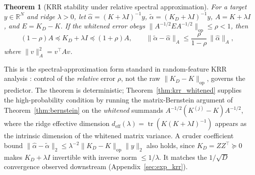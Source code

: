 \documentclass{article}
\newtheorem{theorem}{Theorem}[section]
\begin{document}
\begin{theorem}[KRR stability under relative spectral approximation]\label{thm:krr_spectral}
For a target $y\in\mathbb{R}^N$ and ridge $\lambda>0$, let $\hat\alpha=(K+\lambda I)^{-1}y$, $\tilde\alpha=(K_D+\lambda I)^{-1}y$, $A=K+\lambda I$, and $E=K_D-K$. If the whitened error obeys $\|A^{-1/2}EA^{-1/2}\|_{\mathrm{op}}\le\rho<1$, then
\[
(1-\rho)A\preceq K_D+\lambda I\preceq(1+\rho)A,\qquad \|\tilde\alpha-\hat\alpha\|_A\le\frac{\rho}{1-\rho}\,\|\hat\alpha\|_A,
\]
where $\|v\|_A^2=v^\top A v$.
\end{theorem}
\noindent This is the spectral-approximation form standard in random-feature KRR analysis \citep{avron2017random}: control of the \emph{relative} error $\rho$, not the raw $\|K_D-K\|_{\mathrm{op}}$, governs the predictor. The theorem is deterministic; Theorem~\ref{thm:krr_whitened} supplies the high-probability condition by running the matrix-Bernstein argument of Theorem~\ref{thm:bernstein} on the \emph{whitened} summands $A^{-1/2}(K^{(j)}-K)A^{-1/2}$, where the ridge effective dimension $d_{\mathrm{eff}}(\lambda)=\operatorname{tr}(K(K+\lambda I)^{-1})$ appears as the intrinsic dimension of the whitened matrix variance. A cruder coefficient bound $\|\hat\alpha-\tilde\alpha\|_2\le\lambda^{-2}\|K_D-K\|_{\mathrm{op}}\|y\|_2$ also holds, since $K_D=ZZ^\top\succeq0$ makes $K_D+\lambda I$ invertible with inverse norm $\le1/\lambda$. It matches the $1/\sqrt D$ convergence observed downstream (Appendix~\ref{sec:exp_krr}).
\end{document}

